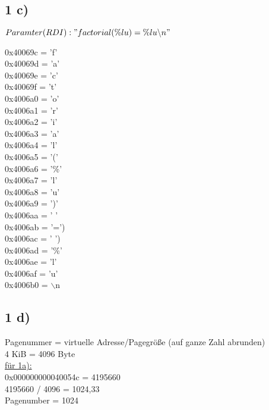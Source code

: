 \documentclass{ti2}
\begin{document}
\subsection*{1 c)}

$Paramter (RDI): "factorial(\%lu) = \%lu{\backslash n}"$

0x40069c = 'f'\\
0x40069d = 'a'\\
0x40069e = 'c'\\
0x40069f = 't'\\
0x4006a0 = 'o'\\
0x4006a1 = 'r'\\
0x4006a2 = 'i'\\
0x4006a3 = 'a'\\
0x4006a4 = 'l'\\
0x4006a5 = '('\\
0x4006a6 = '\%'\\
0x4006a7 = 'l'\\
0x4006a8 = 'u'\\
0x4006a9 = ')'\\
0x4006aa = ' '\\
0x4006ab = '=')\\
0x4006ac = ' ')\\
0x4006ad = '\%'\\
0x4006ae = 'l'\\
0x4006af = 'u'\\
0x4006b0 = $\backslash$n\\

\subsection*{1 d)}

Pagenummer = virtuelle Adresse/Pagegröße (auf ganze Zahl abrunden)\\

4 KiB = 4096 Byte\\

\underline{für 1a):}\\ 
0x000000000040054c = 4195660\\
4195660 / 4096 = 1024,33\\
Pagenumber = 1024\\
\end{document}
